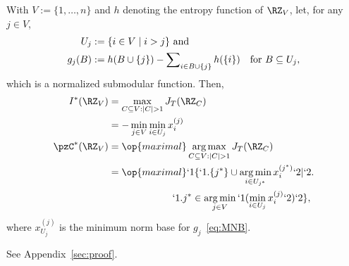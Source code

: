 \begin{Theorem}
	\label{thm:JT}
	With $V:= \{1,\ldots, n\}$ and $h$ denoting the entropy function of $\RZ_V$, let,
	for any $j\in V$,
	\begin{align*}
		U_j &:=\Set {i\in V\mid i>j} \kern0em \text{ and } \\ %
	g_j(B) &:= h(B\cup \Set {j})-\sum\nolimits_{i\in B\cup \Set {j}} h(\Set {i}) \kern1em \text {for }B\subseteq U_j,
	\end{align*}
	which is a normalized submodular function. Then,
	\begin{subequations}
		\begin{align}
		I^*(\RZ_V)&=\max_{C\subseteq V:\abs{C}> 1} J_{T}(\RZ_C) \label{eq:maxJT}\\
		&= -\min_{j\in V} \min_{i\in U_j} x^{(j)}_i \label{eq:maxJT:x}\\ \nextParentEquation
		\pzC^*(\RZ_V)&=\op{maximal}
		\argmax_{C\subseteq V:\abs{C}> 1} J_{T}(\RZ_C)
		\label{eq:argmaxJT}\\
		&=\op{maximal} 
		`1\{`1.\Set{j^*}\cup 
		\argmin_{i\in U_{j^*}} x^{(j^*)}_i `2|`2.  \notag\\
		&\kern6.5em 
		`1.j^*\in \argmin_{j\in V} `1( \min_{i\in U_{j}} x^{(j)}_i `2)
		`2\},\label{eq:argmaxJT:x}
		\end{align}
	\end{subequations}
	where $x^{(j)}_{U_{j}}$ is the minimum norm base for $g_j$~\eqref{eq:MNB}.
\end{Theorem}
\begin{Proof}
	See Appendix~\ref{sec:proof}.
\end{Proof}

